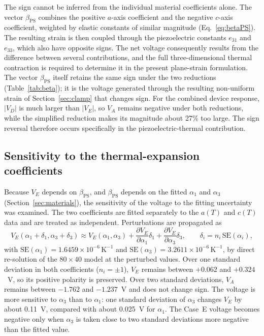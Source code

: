 \documentclass[a4paper, 11pt, twoside]{article}
\begin{document}
The sign cannot be inferred from the individual material coefficients alone. The
vector $\beta_{\mathrm{PS}}$ combines the positive $a$-axis coefficient and the
negative $c$-axis coefficient, weighted by elastic constants of similar magnitude
(Eq.~\eqref{eq:betaPS}). The resulting strain is then coupled through the
piezoelectric constants $e_{31}$ and $e_{33}$, which also have opposite signs. The
net voltage consequently results from the difference between several contributions,
and the full three-dimensional thermal contraction is required to determine it in the
present plane-strain formulation. The vector $\beta_{\mathrm{PS}}$ itself retains the
same sign under the two reductions (Table~\ref{tab:beta}); it is the voltage generated
through the resulting non-uniform strain of Section~\ref{sec:clamp} that changes sign.
For the combined device response, $|V_D|$ is much larger than $|V_E|$, so $V_A$
remains negative under both reductions, while the simplified reduction makes its
magnitude about 27\% too large. The sign reversal therefore occurs specifically in
the piezoelectric-thermal contribution.

\subsection{Sensitivity to the thermal-expansion coefficients}
\label{sec:alpha}

Because $V_E$ depends on $\beta_{\mathrm{PS}}$, and $\beta_{\mathrm{PS}}$ depends on
the fitted $\alpha_1$ and $\alpha_3$ (Section~\ref{sec:materials}), the sensitivity
of the voltage to the fitting uncertainty was examined. The two coefficients are
fitted separately to the $a(T)$ and $c(T)$ data and are treated as independent.
Perturbations are propagated as
\begin{equation}
V_E(\alpha_1+\delta_1,\alpha_3+\delta_3)\approx
V_E(\alpha_1,\alpha_3)
+\frac{\partial V_E}{\partial\alpha_1}\delta_1
+\frac{\partial V_E}{\partial\alpha_3}\delta_3,
\qquad
\delta_i=n_i\,\mathrm{SE}(\alpha_i),
\label{eq:uncertaintyprop}
\end{equation}
with $\mathrm{SE}(\alpha_1)=1.6459\times10^{-6}\,\text{K}^{-1}$ and
$\mathrm{SE}(\alpha_3)=3.2611\times10^{-6}\,\text{K}^{-1}$, by direct re-solution of
the $80\times40$ model at the perturbed values. Over one standard deviation in both
coefficients ($n_i=\pm1$), $V_E$ remains between $+0.062$ and $+0.324$~V, so its
positive polarity is preserved. Over two standard deviations, $V_A$ remains between
$-1.762$ and $-1.237$~V and does not change sign. The voltage is more sensitive to
$\alpha_3$ than to $\alpha_1$: one standard deviation of $\alpha_3$ changes $V_E$ by
about 0.11~V, compared with about 0.025~V for $\alpha_1$. The Case~E voltage becomes
negative only when $\alpha_3$ is taken close to two standard deviations more negative
than the fitted value.
\end{document}
